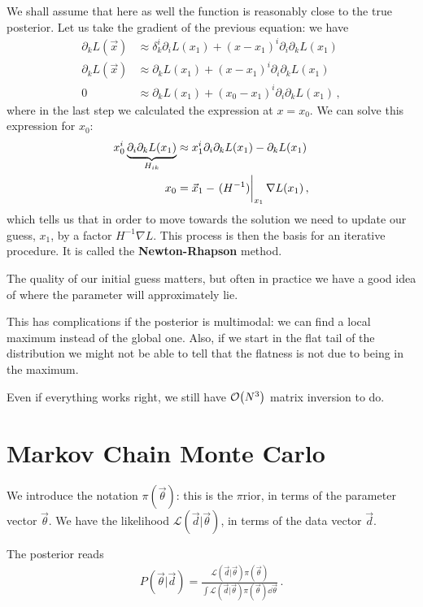 \documentclass[main.tex]{subfiles}
\begin{document}
We shall assume that here as well the function is reasonably close to the true posterior. 
Let us take the gradient of the previous equation: we have 
%
\begin{align}
\partial_{k} L(\vec{x}) 
&\approx 
\delta^{i}_{k} \partial_{i} L(x_1) 
+ (x- x_1 )^{i} \partial_{i} \partial_{k} L (x_1 ) \\
\partial_{k} L (\vec{x}) &\approx
\partial_{k} L (x_1 )
+ (x-x_1 )^{i} \partial_{i} \partial_{k} L (x_1 )  
\\
0 &\approx
\partial_{k} L (x_1 )
+ (x_0-x_1 )^{i} \partial_{i} \partial_{k} L (x_1 )  
\,,
\end{align}
%
where in the last step we calculated the expression at \(x = x_0 \). 
We can solve this expression for \(x_0 \): 
%
\begin{align}
x_0^{i} \underbrace{\partial_{i} \partial_{k} L(x_1 )}_{H_{ik}} &\approx 
x_1^{i} \partial_{i} \partial_{k} L(x_1 ) - \partial_{k} L (x_1 )  \\
x_0 &= \vec{x}_1 - \eval{(H^{-1})}_{x_1 } \nabla L (x_1 ) 
\,,
\end{align}
%
which tells us that in order to move towards the solution we need to update our guess, \(x_1 \), by a factor \(H^{-1} \nabla L\). 
This process is then the basis for an iterative procedure. It is called the \textbf{Newton-Rhapson} method. 

The quality of our initial guess matters, but often in practice we have a good idea of where the parameter will approximately lie. 

This has complications if the posterior is multimodal: we can find a local maximum instead of the global one.
Also, if we start in the flat tail of the distribution we might not be able to tell that the flatness is not due to being in the maximum. 

Even if everything works right, we still have \(\order{N^3}\) matrix inversion to do. 

\section{Markov Chain Monte Carlo}

We introduce the notation \(\pi (\vec{\theta})\): this is the \(\pi \)rior, in terms of the parameter vector \(\vec{\theta}\).
We have the likelihood \(\mathcal{L}(\vec{d} | \vec{\theta})\), in terms of the data vector \(\vec{d}\).

The posterior reads 
%
\begin{align}
P(\vec{\theta} | \vec{d}) =\frac{\mathscr{L} (\vec{d} | \vec{\theta}) \pi (\vec{\theta})}{\int \mathscr{L} (\vec{d} | \vec{\theta}) \pi (\vec{\theta}) \dd{\vec{\theta}}}
\,.
\end{align}
\end{document}
